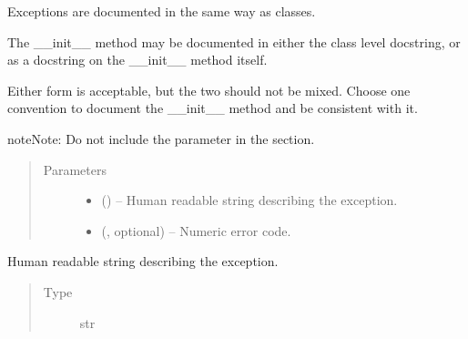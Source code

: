 \documentclass[letterpaper,10pt,english]{sphinxmanual}
\begin{document}
\begin{description}
\begin{fulllineitems}
\begin{fulllineitems}
\end{fulllineitems}


\end{fulllineitems}


\begin{fulllineitems}
\label{\detokenize{autogen:example_docstring.ExampleError}}
Exceptions are documented in the same way as classes.

The \_\_init\_\_ method may be documented in either the class level
docstring, or as a docstring on the \_\_init\_\_ method itself.

Either form is acceptable, but the two should not be mixed. Choose one
convention to document the \_\_init\_\_ method and be consistent with it.

\begin{sphinxadmonition}{note}{Note:}
Do not include the  parameter in the  section.
\end{sphinxadmonition}
\begin{quote}\begin{description}
\item[{Parameters}] \leavevmode\begin{itemize}
\item {} 
 () – Human readable string describing the exception.

\item {} 
 (, optional) – Numeric error code.

\end{itemize}

\end{description}\end{quote}

\begin{fulllineitems}
\label{\detokenize{autogen:example_docstring.ExampleError.msg}}
Human readable string describing the exception.
\begin{quote}\begin{description}
\item[{Type}] \leavevmode
str


\end{description}
\end{quote}
\end{fulllineitems}
\end{fulllineitems}
\end{description}
\end{document}
